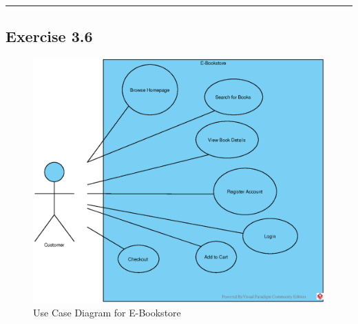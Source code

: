 \vspace{1cm} %

\noindent\rule{\textwidth}{0.4pt} %


\subsection{Exercise 3.6}

\vspace{1em} %

\begin{figure}[H]
    \centering
    \includegraphics[width=\textwidth]{images/EPS/q6-part1.eps}
    \caption{Use Case Diagram for E-Bookstore}
    \label{fig:q6-part1}
\end{figure}

